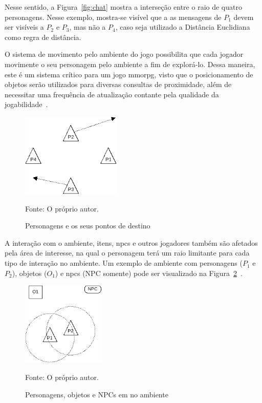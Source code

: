 Nesse sentido, a Figura~\ref{fig:chat} mostra a interseção entre o raio de quatro personagens.
%
Nesse exemplo, mostra-se visível que a as mensagens de $P_1$ devem ser visíveis a $P_2$ e $P_3$, mas não a $P_4$, caso seja utilizado a Distância Euclidiana como regra de distância.



O sistema de movimento pelo ambiente do jogo possibilita que cada jogador movimente o seu personagem pelo ambiente a fim de explorá-lo.
%
Dessa maneira, este é um sistema crítico para um jogo \ac{mmorpg}, visto que o posicionamento de objetos serão utilizados para diversas consultas de proximidade, além de necessitar uma frequência de atualização contante pela qualidade da jogabilidade~\cite{albion_online_unite}.


\begin{figure}[htb!]
\caption{Personagens e os seus pontos de destino}
\label{fig:walk}
\includegraphics[height=4cm]{img/cap2/walk.png}
\centering

Fonte: O próprio autor.
\end{figure}



A interação com o ambiente, itens, \ac{npcs} e outros jogadores também são afetados pela área de interesse, na qual o personagem terá um raio limitante para cada tipo de interação no ambiente.
%
Um exemplo de ambiente com personagens ($P_1$ e $P_2$), objetos ($O_1$) e \ac{npcs} (NPC somente) pode ser visualizado na Figura~\ref{fig:obj_e_npc1}~\cite{albion_online_unite}.

\begin{figure}[htb!]
\caption{Personagens, objetos e NPCs em no ambiente}
\label{fig:obj_e_npc1}
\includegraphics[height=4cm]{img/cap2/obj_e_npc1.png}
\centering

Fonte: O próprio autor.
\end{figure}



